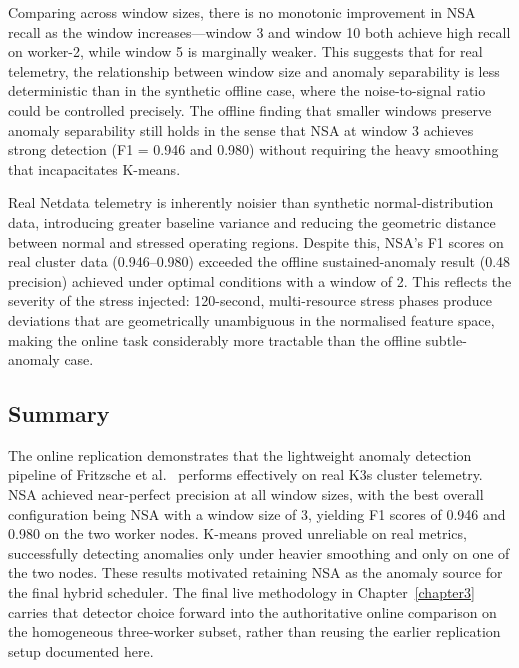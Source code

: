 Comparing across window sizes, there is no monotonic improvement in NSA recall as the window increases---window 3 and window 10 both achieve high recall on worker-2, while window 5 is marginally weaker. This suggests that for real telemetry, the relationship between window size and anomaly separability is less deterministic than in the synthetic offline case, where the noise-to-signal ratio could be controlled precisely. The offline finding that smaller windows preserve anomaly separability still holds in the sense that NSA at window 3 achieves strong detection (F1 = 0.946 and 0.980) without requiring the heavy smoothing that incapacitates K-means.

Real Netdata telemetry is inherently noisier than synthetic normal-distribution data, introducing greater baseline variance and reducing the geometric distance between normal and stressed operating regions. Despite this, NSA's F1 scores on real cluster data (0.946--0.980) exceeded the offline sustained-anomaly result (0.48 precision) achieved under optimal conditions with a window of 2. This reflects the severity of the stress injected: 120-second, multi-resource stress phases produce deviations that are geometrically unambiguous in the normalised feature space, making the online task considerably more tractable than the offline subtle-anomaly case.

\subsection{Summary}

The online replication demonstrates that the lightweight anomaly detection pipeline of Fritzsche et al.~\cite{fritzsche2024lightweight} performs effectively on real K3s cluster telemetry. NSA achieved near-perfect precision at all window sizes, with the best overall configuration being NSA with a window size of 3, yielding F1 scores of 0.946 and 0.980 on the two worker nodes. K-means proved unreliable on real metrics, successfully detecting anomalies only under heavier smoothing and only on one of the two nodes. These results motivated retaining NSA as the anomaly source for the final hybrid scheduler. The final live methodology in Chapter~\ref{chapter3} carries that detector choice forward into the authoritative online comparison on the homogeneous three-worker subset, rather than reusing the earlier replication setup documented here.